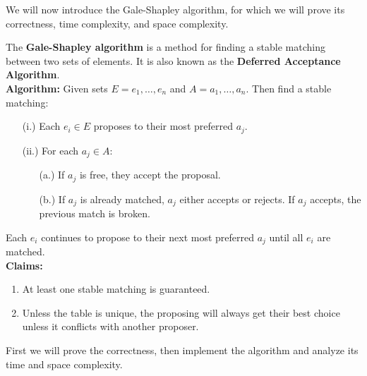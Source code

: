 \noindent
We will now introduce the Gale-Shapley algorithm, for which we will prove its correctness, time complexity, and space complexity.

\begin{theo}

    The \textbf{Gale-Shapley algorithm} is a method for finding a stable matching between two sets of elements. It is also known as the \textbf{Deferred Acceptance Algorithm}.\\

    \noindent
\textbf{Algorithm:}
    Given sets $E={e_1,\dots,e_n}$ and $A={a_1,\dots,a_n}$. Then find a stable matching:
    \begin{enumerate}
        \item [(i.)] Each $e_i\in E$ proposes to their most preferred $a_j$.
        \item [(ii.)] For each $a_j\in A$:
        \begin{enumerate}
            \item [(a.)] If $a_j$ is free, they accept the proposal.
            \item [(b.)] If $a_j$ is already matched, $a_j$ either accepts or rejects. If $a_j$ accepts, the previous match is broken.
        \end{enumerate}
    \end{enumerate}
    \noindent
    Each $e_i$ continues to propose to their next most preferred $a_j$ until all $e_i$ are matched.\\

    \noindent
    \textbf{Claims:}
    \begin{enumerate}
        \item At least one stable matching is guaranteed.
        \item Unless the table is unique, the proposing will always get their best choice unless it conflicts with another proposer.
    \end{enumerate}
\end{theo}
\noindent
First we will prove the correctness, then implement the algorithm and analyze its time and space complexity.

\newpage

